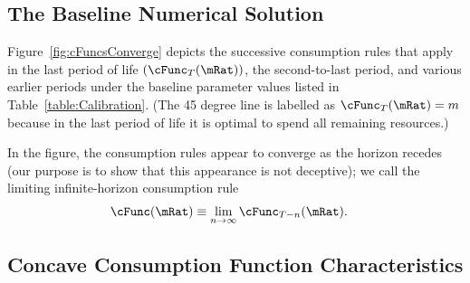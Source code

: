 \documentclass[BufferStockTheory]{subfiles}
\begin{document}
\begin{comment}
  Equation
  \eqref{eq:GIC} can be raised to the $\CRRA$ power yielding the
  alternative form $(\Rfree \DiscFac) \PGroAdj^{-\CRRA} < 1$ which
  Deaton~\citeyearpar{deatonLiqConstr} imposed to guarantee that his
  problem defined a contraction mapping.
\end{comment}


\hypertarget{Baseline-Numerical-Solution}{}
\subsection{The Baseline Numerical Solution}

Figure~\ref{fig:cFuncsConverge} depicts the successive consumption
rules that apply in the last period of life $(\cFunc_{T}(\mRat))$, the
second-to-last period, and various earlier periods under the
baseline parameter values listed in Table~\ref{table:Calibration}.
(The 45 degree line is labelled as $\cFunc_{T}(\mRat) = m$ because in
the last period of life it is optimal to spend all remaining
resources.)

\hypertarget{Calibration}{}



\hypertarget{Symbols}{}



\providecommand{\figName}{Convergence-of-the-Consumption-Rules} %
\providecommand{\figFile}{cFuncsConverge} %
\hypertarget{\figFile}{}
\hypertarget{\figName}{}

In the figure, the consumption rules appear to converge as the horizon
recedes (our purpose is to show that this appearance is not deceptive); we
call the limiting infinite-horizon consumption rule
\begin{equation}\begin{gathered}\begin{aligned}
  \cFunc(\mRat)  & \equiv  \lim_{n \rightarrow \infty} \cFunc_{T-n}(\mRat).
\end{aligned}\end{gathered}\end{equation}

\hypertarget{Concave-Consumption-Function-Characteristics}{}
\subsection{Concave Consumption Function Characteristics}\label{sec:cExists}
\end{document}
